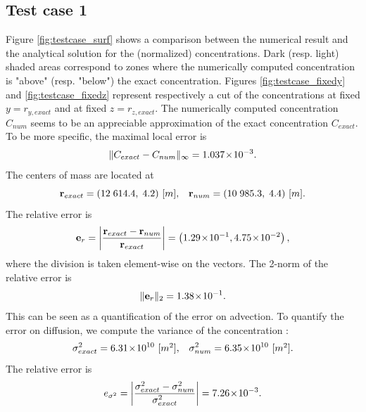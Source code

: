 \subsection{Test case 1}
Figure \ref{fig:testcase_surf} shows a comparison between the numerical result and the analytical solution for the (normalized) concentrations. Dark (resp. light) shaded areas correspond to zones where the numerically computed concentration is "above" (resp. "below") the exact concentration. Figures \ref{fig:testcase_fixedy} and \ref{fig:testcase_fixedz} represent respectively a cut of the concentrations at fixed $y = r_{y,exact}$ and at fixed $z = r_{z,exact}$. The numerically computed concentration $C_{num}$ seems to be an appreciable approximation of the exact concentration $C_{exact}$. To be more specific, the maximal local error is 
\begin{equation}
	\|C_{exact}-C_{num}\|_{\infty} = 1.037\!\times\!10^{-3}.
\end{equation}
The centers of mass are located at
\begin{equation}
	\mathbf r_{exact} = (12\;614.4,\;4.2) \mbox{ [$m$],}\quad \mathbf r_{num} = (10\;985.3,\;4.4) \mbox{ [$m$]}.
\end{equation}
The relative error is
\begin{equation}
	\mathbf e_r = \left \lvert \frac{\mathbf r_{exact}-\mathbf r_{num}}{\mathbf r_{exact}} \right \rvert =  \left(1.29\!\times\!10^{-1}, 4.75\!\times\!10^{-2}\right),
\end{equation}
where the division is taken element-wise on the vectors. The 2-norm of the relative error is
\begin{equation}
	\| \mathbf e_r \|_2 = 1.38\!\times\!10^{-1}.
\end{equation}
This can be seen as a quantification of the error on advection. To quantify the error on diffusion, we compute the variance of the concentration :
\begin{equation}
	\sigma^2_{exact} = 6.31\!\times\!10^{10} \mbox{ [$m^2$],}\quad \sigma^2_{num} = 6.35\!\times\!10^{10} \mbox{ [$m^2$].}
\end{equation}
The relative error is
\begin{equation}
	e_{\sigma^2} = \left \lvert \frac{\sigma^2_{exact}-\sigma^2_{num}}{\sigma^2_{exact}}\right \rvert = 7.26\!\times\!10^{-3}.
\end{equation}
